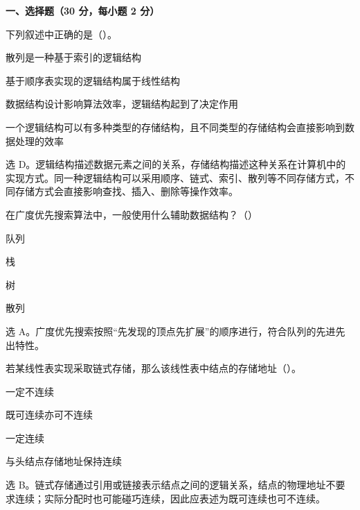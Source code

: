 \textbf{一、选择题（30 分，每小题 2 分）}

\begin{question}
下列叙述中正确的是（\quad）。
\begin{choiceoptions}[1]
  \item 散列是一种基于索引的逻辑结构
  \item 基于顺序表实现的逻辑结构属于线性结构
  \item 数据结构设计影响算法效率，逻辑结构起到了决定作用
  \item 一个逻辑结构可以有多种类型的存储结构，且不同类型的存储结构会直接影响到数据处理的效率
\end{choiceoptions}
\begin{solution}
选 D。逻辑结构描述数据元素之间的关系，存储结构描述这种关系在计算机中的实现方式。同一种逻辑结构可以采用顺序、链式、索引、散列等不同存储方式，不同存储方式会直接影响查找、插入、删除等操作效率。
\end{solution}
\end{question}

\begin{question}
在广度优先搜索算法中，一般使用什么辅助数据结构？（\quad）
\begin{choiceoptions}[2]
  \item 队列
  \item 栈
  \item 树
  \item 散列
\end{choiceoptions}
\begin{solution}
选 A。广度优先搜索按照“先发现的顶点先扩展”的顺序进行，符合队列的先进先出特性。
\end{solution}
\end{question}

\begin{question}
若某线性表实现采取链式存储，那么该线性表中结点的存储地址（\quad）。
\begin{choiceoptions}[2]
  \item 一定不连续
  \item 既可连续亦可不连续
  \item 一定连续
  \item 与头结点存储地址保持连续
\end{choiceoptions}
\begin{solution}
选 B。链式存储通过引用或链接表示结点之间的逻辑关系，结点的物理地址不要求连续；实际分配时也可能碰巧连续，因此应表述为既可连续也可不连续。
\end{solution}
\end{question}

